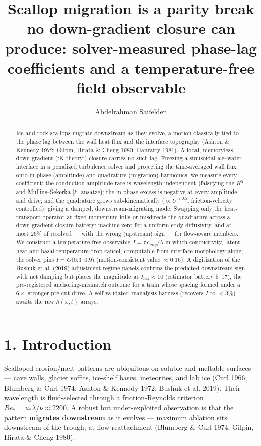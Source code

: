 \documentclass{jfm}
\title{Scallop migration is a parity break no down-gradient closure can produce: solver-measured phase-lag coefficients and a temperature-free field observable}
\author{Abdelrahman Saifelden\aff{1}}
\affiliation{\aff{1}Alexandria Higher Institute of Engineering and Technology (AIET), Alexandria, Egypt}
\begin{document}
\maketitle

\begin{abstract}
Ice and rock scallops migrate downstream as they evolve, a motion classically tied to the phase lag between the wall heat flux and the interface topography (Ashton \& Kennedy 1972; Gilpin, Hirata \& Cheng 1980; Hanratty 1981). A local, memoryless, down-gradient (`K-theory') closure carries no such lag. Freezing a sinusoidal ice--water interface in a penalized turbulence solver and projecting the time-averaged wall flux onto in-phase (amplitude) and quadrature (migration) harmonics, we measure every coefficient: the conduction amplitude rate is wavelength-independent (falsifying the $K^{2}$ and Mullins--Sekerka $|k|$ ans\"atze); the in-phase excess is negative at every amplitude and drive; and the quadrature grows sub-kinematically ($\propto U^{\approx 0.5}$, friction-velocity controlled), giving a damped, downstream-migrating mode. Swapping only the heat-transport operator at fixed momentum kills or misdirects the quadrature across a down-gradient closure battery: machine zero for a uniform eddy diffusivity, and at most $26\%$ of resolved --- with the wrong (upstream) sign --- for flow-aware members. We construct a temperature-free observable $I=\tau\,c_{mig}/\lambda$ in which conductivity, latent heat and basal temperature drop cancel, computable from interface morphology alone; the solver pins $I=O(0.3$--$0.9)$ (motion-consistent value $\approx 0.16$). A digitization of the Bushuk et al. (2019) adjustment-regime panels confirms the predicted downstream sign with net damping but places the magnitude at $I_{obs}\approx 10$ (estimator battery $5$--$17$), the pre-registered anchoring-mismatch outcome for a train whose spacing formed under a $6\times$ stronger pre-cut drive. A self-validated reanalysis harness (recovers $I$ to $<3\%$) awaits the raw $h(x,t)$ arrays.
\end{abstract}

\section*{1. Introduction}


Scalloped erosion/melt patterns are ubiquitous on soluble and meltable surfaces — cave walls, glacier soffits, ice-shelf bases, meteorites, and lab ice (Curl 1966; Blumberg \& Curl 1974; Ashton \& Kennedy 1972; Bushuk et al. 2019). Their wavelength is fluid-selected through a friction-Reynolds criterion $Re_*=u_*\lambda /\nu \approx 2200$. A robust but under-exploited observation is that the pattern \textbf{migrates downstream} as it evolves — maximum ablation sits downstream of the trough, at flow reattachment (Blumberg \& Curl 1974; Gilpin, Hirata \& Cheng 1980).
\end{document}
